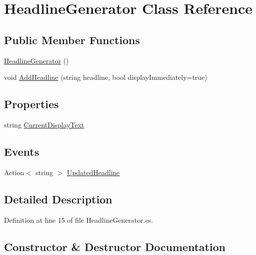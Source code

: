 \hypertarget{class_headline_generator}{}\section{Headline\+Generator Class Reference}
\label{class_headline_generator}
\subsection*{Public Member Functions}
\begin{DoxyCompactItemize}
\item 
\hyperlink{class_headline_generator_a657d5a226e759f92cdb95285cfaa4013}{Headline\+Generator} ()
\item 
void \hyperlink{class_headline_generator_a3d594234aaddb0a385ea7026e8aafe11}{Add\+Headline} (string headline, bool display\+Immediately=true)
\end{DoxyCompactItemize}
\subsection*{Properties}
\begin{DoxyCompactItemize}
\item 
string \hyperlink{class_headline_generator_ae64070408dd3e9ef4c45b777f82bdd96}{Current\+Display\+Text}
\end{DoxyCompactItemize}
\subsection*{Events}
\begin{DoxyCompactItemize}
\item 
Action$<$ string $>$ \hyperlink{class_headline_generator_a1b9116cf3bc873ce28fbf5120f844c86}{Updated\+Headline}
\end{DoxyCompactItemize}


\subsection{Detailed Description}


Definition at line 15 of file Headline\+Generator.\+cs.



\subsection{Constructor \& Destructor Documentation}
\mbox{\label{class_headline_generator_a657d5a226e759f92cdb95285cfaa4013}} 
